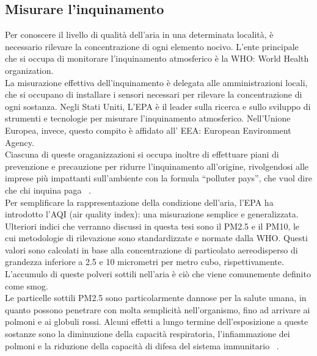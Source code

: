 \subsection{Misurare l'inquinamento}
Per conoscere il livello di qualità dell’aria in una determinata località, è necessario rilevare la concentrazione di ogni elemento nocivo. 
L'ente principale che si occupa di monitorare l'inquinamento atmosferico è la WHO: World Health organization.
\\
La misurazione effettiva dell'inquinamento è delegata alle amministrazioni locali, che si occupano di installare i sensori necessari per rilevare la concentrazione di ogni sostanza.
Negli Stati Uniti, L'EPA è il leader sulla ricerca e sullo sviluppo di strumenti e tecnologie per misurare l'inquinamento atmosferico.
Nell'Unione Europea, invece, questo compito è affidato all' EEA: European Environment Agency.
\\
Ciascuna di queste oraganizzazioni si occupa inoltre di effettuare piani di prevenzione e precauzione per ridurre l'inquinamento all'origine, rivolgendosi alle imprese più impattanti sull'ambiente con la formula “polluter pays”, che vuol dire che chi inquina paga ~\cite{polluter_pays}.
\\ 
Per semplificare la rappresentazione della condizione dell’aria, l’EPA ha introdotto l’AQI (air quality index): una misurazione semplice e generalizzata.
Ulteriori indici che verranno discussi in questa tesi sono il PM2.5 e il PM10, le cui metodologie di rilevazione sono standardizzate e normate dalla WHO.
Questi valori sono calcolati in base alla concentrazione di particolato aereodisperso di grandezza inferiore a 2.5 e 10 micrometri per metro cubo, rispettivamente.
L'accumulo di queste polveri sottili nell'aria è ciò che viene comunemente definito come smog.
\\
Le particelle sottili PM2.5 sono particolarmente dannose per la salute umana, in quanto possono penetrare con molta semplicità nell'organismo, fino ad arrivare ai polmoni e ai globuli rossi.
Alcuni effetti a lungo termine dell'esposizione a queste sostanze sono la diminuzione della capacità respiratoria, l'infiammazione dei polmoni e la riduzione della capacità di difesa del sistema immunitario ~\cite{pmrisk}.
